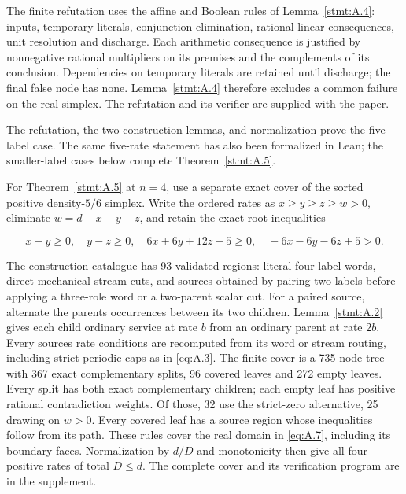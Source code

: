 \documentclass[11pt,a4paper]{article}
\begin{document}
The finite refutation uses the affine and Boolean rules of Lemma~\ref{stmt:A.4}: inputs, temporary literals, conjunction elimination, rational linear consequences, unit resolution and discharge. Each arithmetic consequence is justified by nonnegative rational multipliers on its premises and the complements of its conclusion. Dependencies on temporary literals are retained until discharge; the final false node has none. Lemma~\ref{stmt:A.4} therefore excludes a common failure on the real simplex. The refutation and its verifier are supplied with the paper.

The refutation, the two construction lemmas, and normalization prove the five-label case. The same five-rate statement has also been formalized in Lean; the smaller-label cases below complete Theorem~\ref{stmt:A.5}.

For Theorem~\ref{stmt:A.5} at \(n=4\), use a separate exact cover of the sorted positive density-\(5/6\) simplex. Write the ordered rates as \(x\ge y\ge z\ge w>0\), eliminate \(w=d-x-y-z\), and retain the exact root inequalities

\begin{equation}
x-y\ge0,\quad y-z\ge0,\quad
6x+6y+12z-5\ge0,\quad -6x-6y-6z+5>0.
\tag{A.7}\label{eq:A.7}
\end{equation}

The construction catalogue has 93 validated regions: literal four-label words, direct mechanical-stream cuts, and sources obtained by pairing two labels before applying a three-role word or a two-parent scalar cut. For a paired source, alternate the parent\textquotesingle s occurrences between its two children. Lemma~\ref{stmt:A.2} gives each child ordinary service at rate \(b\) from an ordinary parent at rate \(2b\). Every source\textquotesingle s rate conditions are recomputed from its word or stream routing, including strict periodic caps as in \eqref{eq:A.3}. The finite cover is a 735-node tree with 367 exact complementary splits, 96 covered leaves and 272 empty leaves. Every split has both exact complementary children; each empty leaf has positive rational contradiction weights. Of those, 32 use the strict-zero alternative, 25 drawing on \(w>0\). Every covered leaf has a source region whose inequalities follow from its path. These rules cover the real domain in \eqref{eq:A.7}, including its boundary faces. Normalization by \(d/D\) and monotonicity then give all four positive rates of total \(D\le d\). The complete cover and its verification program are in the supplement.
\end{document}
